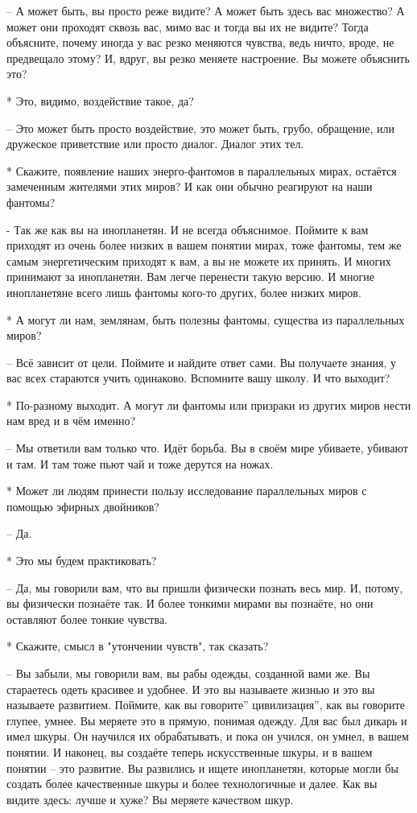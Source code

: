   – А может быть, вы просто реже видите? А может быть здесь вас множество? А может они проходят сквозь вас, мимо вас и тогда вы их не видите? Тогда объясните, почему иногда у вас резко меняются чувства, ведь ничто, вроде, не предвещало этому? И, вдруг, вы резко меняете настроение. Вы можете объяснить это?

 * Это, видимо, воздействие такое, да?

 – Это может быть просто воздействие, это может быть, грубо, обращение, или дружеское приветствие или просто диалог. Диалог этих тел.

 * Скажите, появление наших энерго-фантомов в параллельных мирах, остаётся замеченным жителями этих миров? И как они обычно реагируют на наши фантомы?

 - Так же как вы на инопланетян. И не всегда объяснимое. Поймите к вам приходят из очень более низких в вашем понятии мирах, тоже фантомы, тем же самым энергетическим приходят к вам, а вы не можете их принять. И многих принимают за инопланетян. Вам легче перенести такую версию. И многие инопланетяне всего лишь фантомы кого-то других, более низких миров.

 * А могут ли нам, землянам, быть полезны фантомы, существа из параллельных миров?

 – Всё зависит от цели. Поймите и найдите ответ сами. Вы получаете знания, у вас всех стараются учить одинаково. Вспомните вашу школу. И что выходит?

 * По-разному выходит. А могут ли фантомы или призраки из других миров нести нам вред и в чём именно?

 – Мы ответили вам только что. Идёт борьба. Вы в своём мире убиваете, убивают и там. И там тоже пьют чай и тоже дерутся на ножах.

 * Может ли людям принести пользу исследование параллельных миров с помощью эфирных двойников?

 – Да.

 * Это мы будем практиковать?

 – Да, мы говорили вам, что вы пришли физически познать весь мир. И, потому, вы физически познаёте так. И более тонкими мирами вы познаёте, но они оставляют более тонкие чувства.

 * Скажите, смысл в "утончении чувств", так сказать?

 – Вы забыли, мы говорили вам, вы рабы одежды, созданной вами же. Вы стараетесь одеть красивее и удобнее. И это вы называете жизнью и это вы называете развитием. Поймите, как вы говорите” цивилизация”, как вы говорите глупее, умнее. Вы меряете это в прямую, понимая одежду. Для вас был дикарь и имел шкуры. Он научился их обрабатывать, и пока он учился, он умнел, в вашем понятии. И наконец, вы создаёте теперь искусственные шкуры, и в вашем понятии – это развитие. Вы развились и ищете инопланетян, которые могли бы создать более качественные шкуры и более технологичные и далее. Как вы видите здесь: лучше и хуже? Вы меряете качеством шкур.

